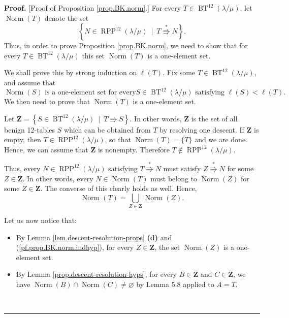 \documentclass[12pt]{article}
\theoremstyle{plain}
\theoremstyle{definition}
\newenvironment{proof}[1][Proof]{\noindent\textbf{#1.} }{\ \rule{0.5em}{0.5em}}
\def\OneTwoRPP{{\operatorname{RPP}^{12}\left(  \lambda/\mu\right)}}
\def\BenignTables{{\operatorname{BT}^{12}\left(  \lambda/\mu\right)}}
\begin{document}
\begin{proof}
[Proof of Proposition \ref{prop.BK.norm}.] For every $T\in\BenignTables$, let
$\operatorname*{Norm}\left(  T\right)  $ denote the set%
\[
\left\{  N\in\OneTwoRPP\ \mid\ T\overset{\ast}{\Rrightarrow}N\right\}  .
\]
Thus, in order to prove Proposition \ref{prop.BK.norm}, we need to show that for every $T\in\BenignTables$ this set $\operatorname*{Norm}%
\left(  T\right)  $ is a one-element set.

We shall prove this by strong induction on $\ell\left(  T\right)  $. Fix
some $T\in\BenignTables$, and assume that
\begin{equation}
\operatorname*{Norm}\left(  S\right)  \text{ is a one-element set for every
}S\in\BenignTables\text{ satisfying }\ell\left(  S\right)  <\ell\left(  T\right)
\text{.}\label{pf.prop.BK.norm.indhyp}%
\end{equation}
We then need to prove that $\operatorname*{Norm}\left(  T\right)  $ is a
one-element set.

Let $\mathbf{Z} = \left\{  S\in\BenignTables\ \mid\ T\Rrightarrow
S\right\}  $. In other words, $\mathbf{Z}$ is the set of all benign 12-tables
$S$ which can be obtained from $T$ by resolving one descent. If
$\mathbf{Z}$ is empty, then $T \in \OneTwoRPP$, so that
$\operatorname*{Norm}\left(  T\right) = \{T\}$ and we are done. Hence, we can
assume that $\mathbf{Z}$ is nonempty. Therefore $T \notin \OneTwoRPP$.

Thus, every $N \in \OneTwoRPP$ satisfying $T \overset{\ast}{\Rrightarrow} N$
must satisfy $Z \overset{\ast}{\Rrightarrow} N$ for some $Z \in \mathbf{Z}$.
In other words, every $N \in \operatorname{Norm}\left(T\right)$ must belong
to $\operatorname{Norm}\left(Z\right)$ for some $Z \in \mathbf{Z}$. The
converse of this clearly holds as well. Hence, 
\begin{equation}
\operatorname*{Norm}\left(  T\right)  =\bigcup_{Z\in\mathbf{Z}%
}\operatorname*{Norm}\left(  Z\right)  .
\label{pf.prop.BK.norm.union}
\end{equation}

Let us now notice that:

\begin{itemize}
\item By Lemma \ref{lem.descent-resolution-props} \textbf{(d)} and
(\ref{pf.prop.BK.norm.indhyp}), for every $Z\in\mathbf{Z}$, the set
$\operatorname*{Norm}\left( Z\right)  $ is a one-element set.

\item By Lemma \ref{prop.descent-resolution-hyps}, for every
$B\in\mathbf{Z}$ and $C\in\mathbf{Z}$, we have
$\operatorname*{Norm}\left(  B\right)  \cap\operatorname*{Norm}\left(
C\right)  \neq\varnothing$ by Lemma 5.8 applied to $A=T$.


\end{itemize}
\end{proof}
\end{document}
